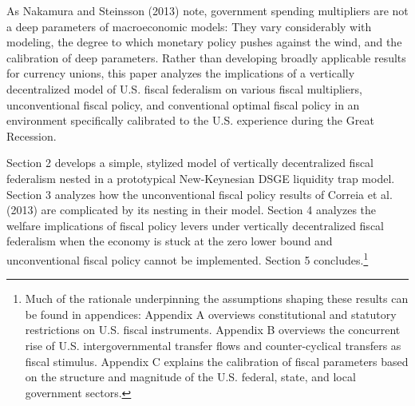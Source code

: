 \documentclass[12pt,letterpaper]{article}
\begin{document}
\bigskip

As Nakamura and Steinsson (2013) note, government spending multipliers are not a deep parameters of macroeconomic models: They vary considerably with modeling, the degree to which monetary policy pushes against the wind, and the calibration of deep parameters. Rather than developing broadly applicable results for currency unions, this paper analyzes the implications of a vertically decentralized model of U.S. fiscal federalism on various fiscal multipliers, unconventional fiscal policy, and conventional optimal fiscal policy in an environment specifically calibrated to the U.S. experience during the Great Recession.  

Section 2 develops a simple, stylized model of vertically decentralized fiscal federalism nested in a prototypical New-Keynesian DSGE liquidity trap model. Section 3 analyzes how the unconventional fiscal policy results of Correia et al. (2013) are complicated by its nesting in their model. Section 4 analyzes the welfare implications of fiscal policy levers under vertically decentralized fiscal federalism when the economy is stuck at the zero lower bound and unconventional fiscal policy cannot be implemented. Section 5 concludes.\footnote{Much of the rationale underpinning the assumptions shaping these results can be found in appendices: Appendix A overviews constitutional and statutory restrictions on U.S. fiscal instruments. Appendix B overviews the concurrent rise of U.S. intergovernmental transfer flows and counter-cyclical transfers as fiscal stimulus. Appendix C explains the calibration of fiscal parameters based on the structure and magnitude of the U.S. federal, state, and local government sectors.} 
\end{document}
